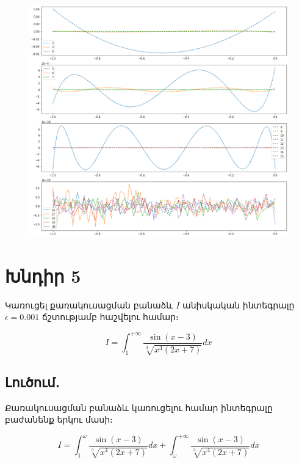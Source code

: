 \documentclass{article}
\begin{document}
\begin{figure}[h]
   \includegraphics[width=\textwidth]{images/lagrange_optimal_nodes}
\end{figure}



\newpage

\section*{Խնդիր 5}

Կառուցել քառակուսացման բանաձև $I$ անիսկական ինտեգրալը $\epsilon = 0.001$ ճշտությամբ հաշվելու համար։

						$$I = \int_{1}^{+\infty}\dfrac{\sin\left(x - 3\right)}{\sqrt[3]{x^{4}\left(2x+7\right)}}dx$$


\subsection*{Լուծում․}

Քառակուսացման բանաձև կառուցելու համար ինտեգրալը բաժանենք երկու մասի։


\begin{equation} \label{eq}
				I = \int_{1}^{\omega}\dfrac{\sin\left(x - 3\right)}{\sqrt[3]{x^{4}\left(2x+7\right)}}dx + \int_{\omega}^{+\infty}\dfrac{\sin\left(x - 3\right)}{\sqrt[3]{x^{4}\left(2x+7\right)}}dx
\end{equation}
\end{document}
